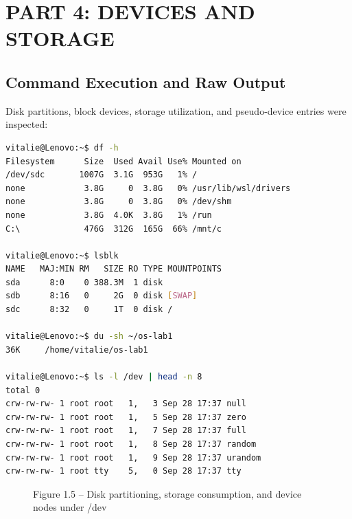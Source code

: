 \documentclass[12pt,a4paper]{report}
\numberwithin{equation}{chapter}
\numberwithin{figure}{chapter}
\numberwithin{table}{chapter}
\begin{document}
\chapter{PART 4: DEVICES AND STORAGE}

\section{Command Execution and Raw Output}
Disk partitions, block devices, storage utilization, and pseudo-device entries were inspected:

\begin{lstlisting}[language=bash]
vitalie@Lenovo:~$ df -h
Filesystem      Size  Used Avail Use% Mounted on
/dev/sdc       1007G  3.1G  953G   1% /
none            3.8G     0  3.8G   0% /usr/lib/wsl/drivers
none            3.8G     0  3.8G   0% /dev/shm
none            3.8G  4.0K  3.8G   1% /run
C:\             476G  312G  165G  66% /mnt/c

vitalie@Lenovo:~$ lsblk
NAME   MAJ:MIN RM   SIZE RO TYPE MOUNTPOINTS
sda      8:0    0 388.3M  1 disk 
sdb      8:16   0     2G  0 disk [SWAP]
sdc      8:32   0     1T  0 disk /

vitalie@Lenovo:~$ du -sh ~/os-lab1
36K     /home/vitalie/os-lab1

vitalie@Lenovo:~$ ls -l /dev | head -n 8
total 0
crw-rw-rw- 1 root root   1,   3 Sep 28 17:37 null
crw-rw-rw- 1 root root   1,   5 Sep 28 17:37 zero
crw-rw-rw- 1 root root   1,   7 Sep 28 17:37 full
crw-rw-rw- 1 root root   1,   8 Sep 28 17:37 random
crw-rw-rw- 1 root root   1,   9 Sep 28 17:37 urandom
crw-rw-rw- 1 root tty    5,   0 Sep 28 17:37 tty
\end{lstlisting}

\begin{figure}[H]
\centering
\caption{Figure 1.5 -- Disk partitioning, storage consumption, and device nodes under /dev}
\end{figure}
\end{document}
